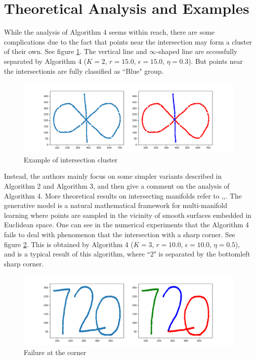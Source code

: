 \documentclass[twoside,11pt]{article}
\begin{document}
\section{Theoretical Analysis and Examples}
While the analysis of Algorithm 4 seems within reach, there are some complications due to
the fact that points near the intersection may form a cluster of their own. See figure \ref{fig1}.
The vertical line and $\infty$-shaped line are sccessfully separated by Algorithm 4 ($K = 2$, $r = 15.0$, $\epsilon = 15.0$, $\eta = 0.3$).
But points near the intersectionis are fully classified as ``Blue" group. 
\begin{figure}[htbp]
\centering
\vspace{-1em}
\includegraphics[width=0.9  \textwidth]{infinity_shape.png}
\vspace{-1em}
\caption{Example of intersection cluster}
\label{fig1}
\end{figure}

Instead, the authors mainly focus on some simpler variants described in Algorithm 2
and Algorithm 3, and then give a comment on the analysis of Algorithm 4. More theoretical results on intersecting manifolds 
refer to \cite{arias2011},\cite{chen2009},\cite{soltanolkotabi2012}. The generative model is a natural mathematical framework for multi-manifold learning where points are sampled in the vicinity of smooth surfaces embedded in Euclidean
space. One can see in the numerical experiments that the Algorithm 4 fails to deal with phenomenon that the intersection with a sharp corner. See figure \ref{sharp_720}. This is obtained by  Algorithm 4  ($K = 3$, $r = 10.0$, $\epsilon = 10.0$, $\eta = 0.5$), and is a typical result of this algorithm, where ``2" is separated by the bottomleft sharp corner.
\begin{figure}[htbp]
\centering
\vspace{-1em}
\includegraphics[width=0.9  \textwidth]{sharp_720.png}
\vspace{-1em}
\caption{Failure at the corner}
\label{sharp_720}
\end{figure}
\end{document}
